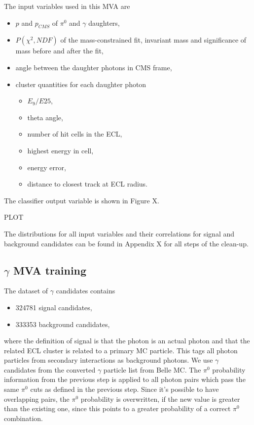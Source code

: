 \documentclass[oneside,a4paper,openany,12pt]{scrbook}
\begin{document}
The input variables used in this MVA are
\begin{itemize}
\item $p$ and $p_{CMS}$ of $\pi^0$ and $\gamma$ daughters,
\item $P(\chi^2,NDF)$ of the mass-constrained fit, invariant mass and significance of mass before and after the fit,
\item angle between the daughter photons in CMS frame,
\item cluster quantities for each daughter photon
	\begin{itemize}
	\item $E_9/E{25}$,
	\item theta angle,
	\item number of hit cells in the ECL,
	\item highest energy in cell,
	\item energy error,
	\item distance to closest track at ECL radius.
	\end{itemize}
\end{itemize}

The classifier output variable is shown in Figure X.

\begin{center}
PLOT
\end{center}

The distributions for all input variables and their correlations for signal and background candidates can be found in Appendix X for all steps of the clean-up.


\subsection{$\gamma$ MVA training}

The dataset of $\gamma$ candidates contains
\begin{itemize}
\item 324781 signal candidates,
\item 333353 background candidates,
\end{itemize}
where the definition of signal is that the photon is an actual photon and that the related ECL cluster is related to a primary MC particle. This tags all photon particles from secondary interactions as background photons. We use $\gamma$ candidates from the converted $\gamma$ particle list from Belle MC. The $\pi^0$ probability information from the previous step is applied to all photon pairs which pass the same $\pi^0$ cuts as defined in the previous step. Since it's possible to have overlapping pairs, the $\pi^0$ probability is overwritten, if the new value is greater than the existing one, since this points to a greater probability of a correct $\pi^0$ combination.
\end{document}
